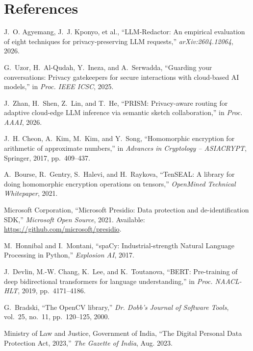 \documentclass[10pt,a4paper]{article}
\begin{document}
\section*{References}
\small
\begin{enumerate}[label={[\arabic*]},noitemsep,leftmargin=*]
    \item J.~O. Agyemang, J.~J. Kponyo, et al., ``LLM-Redactor: An empirical evaluation of eight techniques for privacy-preserving LLM requests,'' \emph{arXiv:2604.12064}, 2026.
    \item G.~Uzor, H.~Al-Qudah, Y.~Ineza, and A.~Serwadda, ``Guarding your conversations: Privacy gatekeepers for secure interactions with cloud-based AI models,'' in \emph{Proc. IEEE ICSC}, 2025.
    \item J.~Zhan, H.~Shen, Z.~Lin, and T.~He, ``PRISM: Privacy-aware routing for adaptive cloud-edge LLM inference via semantic sketch collaboration,'' in \emph{Proc. AAAI}, 2026.
    \item J.~H. Cheon, A.~Kim, M.~Kim, and Y.~Song, ``Homomorphic encryption for arithmetic of approximate numbers,'' in \emph{Advances in Cryptology -- ASIACRYPT}, Springer, 2017, pp.~409--437.
    \item A.~Bourse, R.~Gentry, S.~Halevi, and H.~Raykova, ``TenSEAL: A library for doing homomorphic encryption operations on tensors,'' \emph{OpenMined Technical Whitepaper}, 2021.
    \item Microsoft Corporation, ``Microsoft Presidio: Data protection and de-identification SDK,'' \emph{Microsoft Open Source}, 2021. Available: \url{https://github.com/microsoft/presidio}.
    \item M.~Honnibal and I.~Montani, ``spaCy: Industrial-strength Natural Language Processing in Python,'' \emph{Explosion AI}, 2017.
    \item J.~Devlin, M.-W. Chang, K.~Lee, and K.~Toutanova, ``BERT: Pre-training of deep bidirectional transformers for language understanding,'' in \emph{Proc. NAACL-HLT}, 2019, pp.~4171--4186.
    \item G.~Bradski, ``The OpenCV library,'' \emph{Dr. Dobb's Journal of Software Tools}, vol.~25, no.~11, pp.~120--125, 2000.
    \item Ministry of Law and Justice, Government of India, ``The Digital Personal Data Protection Act, 2023,'' \emph{The Gazette of India}, Aug. 2023.
\end{enumerate}
\end{document}
